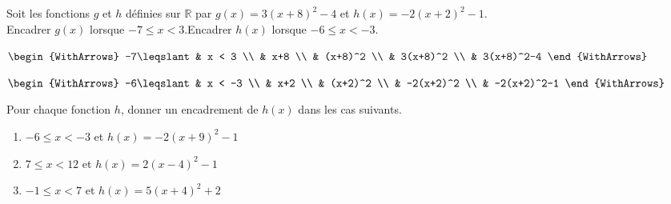 \documentclass[main.tex]{subfiles}
\begin{document}
\begin{example} Soit les fonctions $g$ et $h$ définies sur $\mathbb{R}$ par $g(x)=3(x+8)^2-4$ et $h(x)=-2(x+2)^2-1$. \\
Encadrer $g(x)$ lorsque $-7\leqslant x < 3$.\hfill  Encadrer $h(x)$ lorsque $-6\leqslant x < -3$.\\
	\noindent\hfill\parbox{0.45\linewidth}{	
		$\begin{WithArrows}
			-7\leqslant & x < 3 \\
			&  x+8   \\    
			&  (x+8)^2   \\    
			&  3(x+8)^2   \\    
			&  3(x+8)^2-4       
		\end{WithArrows}$ 	
	}    \hfill\parbox{0.31\linewidth}{	
		$\begin{WithArrows}
				-6\leqslant & x < -3 \\
			&  x+2   \\    
			&  (x+2)^2   \\    
			&  -2(x+2)^2   \\    
			&  -2(x+2)^2-1     
		\end{WithArrows}$ 	
	} 
\end{example} 
\begin{exercise} Pour chaque fonction $h$, donner un encadrement de $h(x)$ dans les cas suivants.
\begin{enumerate}[label={\arabic*)}, leftmargin=*]   
	\item $-6\leqslant x < -3$ et  $h(x)=-2(x+9)^2-1$ 
	\item $7\leqslant x <12$ et  $h(x)=2(x-4)^2-1$ 
	\item $-1\leqslant x < 7$ et  $h(x)=5(x+4)^2+2$  
\end{enumerate}
\end{exercise}
\end{document}
